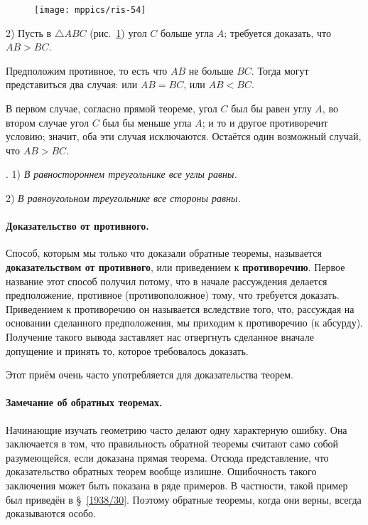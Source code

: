 {

\begin{figure}
\centering
\texttt{[image: mppics/ris-54]}
\caption{}\label{1938/ris-54}
\end{figure}

2) Пусть в $\triangle ABC$ (рис.~\ref{1938/ris-54})
угол $C$ больше угла $A$;
требуется доказать, что $AB > BC$.

Предположим противное, то есть что $AB$ не больше $BC$.
Тогда могут представиться два случая:
или $AB=BC$, или $AB<BC$.

В первом случае, согласно прямой теореме, угол $C$ был бы равен углу $A$, во втором случае угол $C$ был бы меньше угла $A$;
и то и другое противоречит условию;
значит, оба эти случая исключаются.
Остаётся один возможный случай, что $AB>BC$.

}

\smallskip
\mbox{.}
1) \emph{В равностороннем треугольнике все углы равны.}

2) \emph{В равноугольном треугольнике все стороны равны.}

{\sloppy
\paragraph{Доказательство от противного.}\label{1938/48}
Способ, которым мы только что доказали обратные теоремы, называется \textbf{доказательством от противного}, или приведением к \textbf{противоречию}.
Первое название этот способ получил потому, что в начале рассуждения делается предположение, противное (противоположное) тому, что требуется доказать.
Приведением к противоречию он называется вследствие того, что, рассуждая на основании сделанного предположения, мы приходим к противоречию (к абсурду).
Получение такого вывода заставляет нас отвергнуть сделанное вначале допущение и принять то, которое требовалось доказать.

}

Этот приём очень часто употребляется для доказательства теорем.

\paragraph{Замечание об обратных теоремах.}\label{1938/49}
Начинающие изучать геометрию часто делают одну характерную ошибку.
Она заключается в том, что правильность обратной теоремы считают само собой разумеющейся, если доказана прямая теорема.
Отсюда представление, что доказательство обратных теорем вообще излишне.
Ошибочность такого заключения может быть показана в ряде примеров.
В частности, такой пример был приведён в §~\ref{1938/30}.
Поэтому обратные теоремы, когда они верны, всегда доказываются особо.



